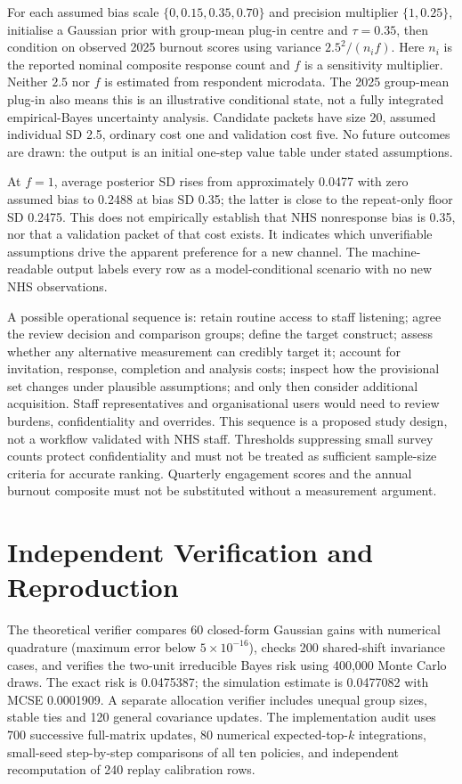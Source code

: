 For each assumed bias scale $\{0,0.15,0.35,0.70\}$ and precision multiplier $\{1,0.25\}$, initialise a Gaussian prior with group-mean plug-in centre and $\tau=0.35$, then condition on observed 2025 burnout scores using variance $2.5^2/(n_i f)$. Here $n_i$ is the reported nominal composite response count and $f$ is a sensitivity multiplier. Neither $2.5$ nor $f$ is estimated from respondent microdata. The 2025 group-mean plug-in also means this is an illustrative conditional state, not a fully integrated empirical-Bayes uncertainty analysis. Candidate packets have size 20, assumed individual SD 2.5, ordinary cost one and validation cost five. No future outcomes are drawn: the output is an initial one-step value table under stated assumptions.

At $f=1$, average posterior SD rises from approximately 0.0477 with zero assumed bias to 0.2488 at bias SD 0.35; the latter is close to the repeat-only floor SD 0.2475. This does not empirically establish that NHS nonresponse bias is 0.35, nor that a validation packet of that cost exists. It indicates which unverifiable assumptions drive the apparent preference for a new channel. The machine-readable output labels every row as a model-conditional scenario with no new NHS observations.

A possible operational sequence is: retain routine access to staff listening; agree the review decision and comparison groups; define the target construct; assess whether any alternative measurement can credibly target it; account for invitation, response, completion and analysis costs; inspect how the provisional set changes under plausible assumptions; and only then consider additional acquisition. Staff representatives and organisational users would need to review burdens, confidentiality and overrides. This sequence is a proposed study design, not a workflow validated with NHS staff. Thresholds suppressing small survey counts protect confidentiality and must not be treated as sufficient sample-size criteria for accurate ranking. Quarterly engagement scores and the annual burnout composite must not be substituted without a measurement argument.

\section{Independent Verification and Reproduction}
The theoretical verifier compares 60 closed-form Gaussian gains with numerical quadrature (maximum error below $5\times10^{-16}$), checks 200 shared-shift invariance cases, and verifies the two-unit irreducible Bayes risk using 400,000 Monte Carlo draws. The exact risk is 0.0475387; the simulation estimate is 0.0477082 with MCSE 0.0001909. A separate allocation verifier includes unequal group sizes, stable ties and 120 general covariance updates. The implementation audit uses 700 successive full-matrix updates, 80 numerical expected-top-$k$ integrations, small-seed step-by-step comparisons of all ten policies, and independent recomputation of 240 replay calibration rows.

